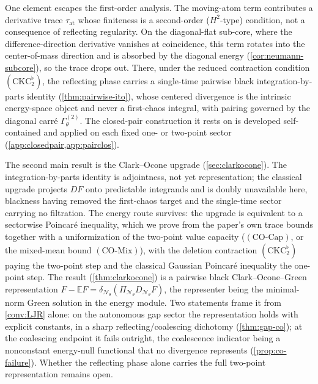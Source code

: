 \documentclass[reqno,final,11pt]{amsart}
\theoremstyle{plain}
\theoremstyle{definition}
\theoremstyle{remark}
\newcommand{\E}{\mathbb E}
\newcommand{\cN}{\mathcal N}
\newcommand{\GamT}{\Gamma^{(2)}_{\theta}}
\newcommand{\DN}{D_{\cN_\theta}}
\newcommand{\divN}{\delta_{\cN_\theta}}
\newcommand{\PiN}{\Pi_{\cN_\theta}}
\newcommand{\COcap}{(\mathrm{CO\text{-}Cap})}
\newcommand{\COmix}{(\mathrm{CO\text{-}Mix})}
\begin{document}
One element escapes the first-order analysis. The moving-atom term contributes
a derivative trace $\tau_{\mathrm{at}}$ whose finiteness is a second-order ($H^2$-type) condition, not a consequence of reflecting regularity.
On the diagonal-flat sub-core, where the difference-direction derivative vanishes
at coincidence, this term rotates into the center-of-mass direction and is
absorbed by the diagonal energy (\cref{cor:neumann-subcore}), so the trace drops
out. There, under the reduced contraction condition $(\mathrm{CKC}_2^{\flat})$,
the reflecting phase carries a single-time pairwise
black integration-by-parts identity (\cref{thm:pairwise-ito}), whose centered
divergence is the intrinsic energy-space object and never a first-chaos integral,
with pairing governed by the diagonal carr\'e $\GamT$. The closed-pair
construction it rests on is developed self-contained and applied on each fixed
one- or two-point sector (\cref{app:closedpair,app:pairclos}).

The second main result is the Clark--Ocone upgrade
(\cref{sec:clarkocone}). The integration-by-parts identity is adjointness, not
yet representation; the classical upgrade projects $DF$ onto predictable
integrands and is doubly unavailable here, blackness having removed the
first-chaos target and the single-time sector carrying no filtration. The
energy route survives: the upgrade is equivalent to a sectorwise Poincar\'e
inequality, which we prove from the paper's own trace bounds together with a
uniformization of the two-point value capacity ($\COcap$, or the mixed-mean
bound $\COmix$), with the deletion contraction $(\mathrm{CKC}_2^{\flat})$ paying
the two-point step and the classical Gaussian Poincar\'e inequality the
one-point step. The result (\cref{thm:clarkocone}) is a pairwise black
Clark--Ocone--Green representation $F-\E F=\divN(\PiN\DN F)$, the representer
being the minimal-norm Green solution in the energy module. Two statements
frame it from \cref{conv:LJR} alone: on the autonomous gap sector the
representation holds with explicit constants, in a sharp
reflecting/coalescing dichotomy (\cref{thm:gap-co}); at the coalescing
endpoint it fails outright, the coalescence indicator being a nonconstant
energy-null functional that no divergence represents (\cref{prop:co-failure}).
Whether the reflecting phase alone carries the full two-point representation
remains open.
\end{document}
